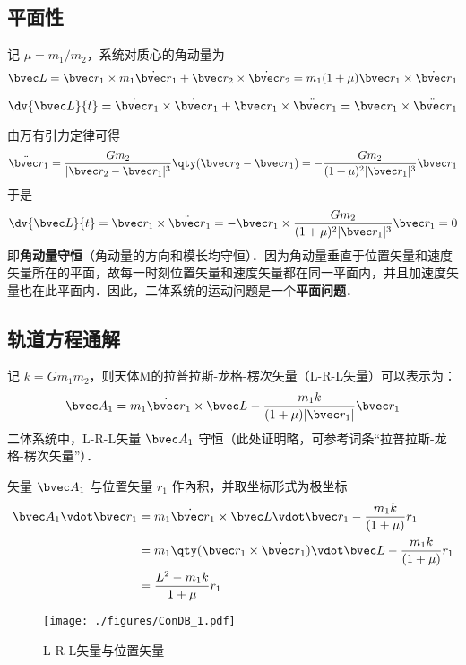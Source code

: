 \subsection{平面性}
 记 $\mu=m_1/m_2$，系统对质心的角动量为
\begin{equation}
\bvec L =\bvec r_1 \times m_1 \dot{\bvec r}_1+ \bvec r_2 \times \dot{\bvec r}_2 = m_1 (1+\mu)\bvec r_1 \times \dot{\bvec r}_1
\end{equation}

\begin{equation}
\dv{\bvec L}{t} = \dot{\bvec r}_1 \times \dot{\bvec r}_1 + \bvec r_1 \times \ddot{\bvec r}_1=\bvec r_1 \times \ddot{\bvec r}_1
\end{equation}

由万有引力定律可得
\begin{equation}\label{ConDB_eq4}
\ddot{\bvec r}_1 = \frac{Gm_2}{|\bvec r_2 - \bvec r_1|^3} \qty(\bvec r_2 - \bvec r_1) = - \frac{Gm_2}{(1+\mu)^2|\bvec r_1|^3}\bvec r_1
\end{equation}
于是
\begin{equation}
\dv{\bvec L}{t} =\bvec r_1 \times \ddot{\bvec r}_1= -\bvec r_1 \times \frac{Gm_2}{(1+\mu)^2|\bvec r_1|^3}\bvec r_1= 0
\end{equation}
即\textbf{角动量守恒}（角动量的方向和模长均守恒）．因为角动量垂直于位置矢量和速度矢量所在的平面，故每一时刻位置矢量和速度矢量都在同一平面内，并且加速度矢量也在此平面内．因此，二体系统的运动问题是一个\textbf{平面问题}．

\subsection{轨道方程通解}
记 $k=Gm_1m_2$，则天体M的拉普拉斯-龙格-楞次矢量（L-R-L矢量）可以表示为：
\begin{equation}
\bvec A_1 = m_1\dot{\bvec r}_1 \times \bvec L - \frac{m_1k}{(1+\mu)|\bvec r_1|}\bvec r_1
\end{equation}
二体系统中，L-R-L矢量 $\bvec A_1$ 守恒（此处证明略，可参考词条“拉普拉斯-龙格-楞次矢量”）．

矢量 $\bvec A_1$ 与位置矢量 $r_1$ 作內积，并取坐标形式为极坐标
\begin{equation}\label{ConDB_eq7}
\begin{aligned}
\bvec A_1 \vdot \bvec r_1 &= m_1\dot{\bvec r}_1 \times \bvec L \vdot \bvec r_1 - \frac{m_1k}{(1+\mu)}r_1\\
&= m_1\qty(\bvec r_1 \times \dot{\bvec r}_1)\vdot \bvec L - \frac{m_1k}{(1+\mu)}r_1 \\
&= \frac{L^2-m_1k}{1+\mu}r_1
\end{aligned}
\end{equation}
\begin{figure}[ht]
\centering
\texttt{[image: ./figures/ConDB\_1.pdf]}
\caption{L-R-L矢量与位置矢量} \label{ConDB_fig1}
\end{figure}

